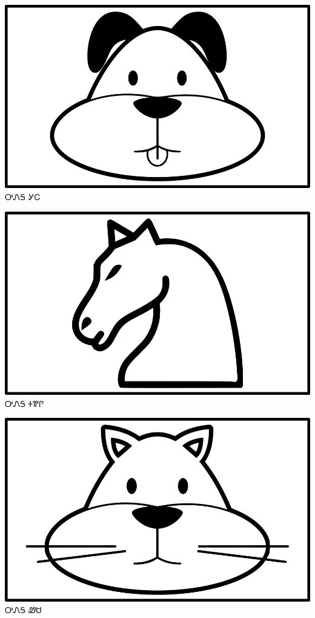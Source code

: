 \documentclass[avery5371]{flashcards}%
\begin{document}
    \begin{flashcard}{
        \includegraphics[width=0.95\columnwidth,height=.51\columnwidth,keepaspectratio]{../artwork/objects-animate/gihli}
    }
        \Huge ᎤᏁᎦ ᎩᏟ
    \end{flashcard}

    \begin{flashcard}{
        \includegraphics[width=0.95\columnwidth,height=.51\columnwidth,keepaspectratio]{../artwork/objects-animate/soquili}
    }
        \Huge ᎤᏁᎦ ᏐᏈᎵ
    \end{flashcard}

    \begin{flashcard}{
        \includegraphics[width=0.95\columnwidth,height=.51\columnwidth,keepaspectratio]{../artwork/objects-animate/wesa}
    }
        \Huge ᎤᏁᎦ ᏪᏌ
    \end{flashcard}
\end{document}
